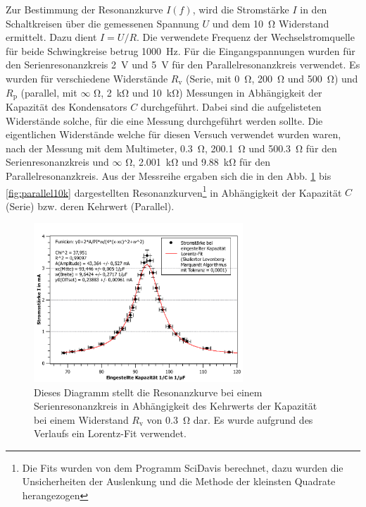 	Zur Bestimmung der Resonanzkurve $I(f)$, wird die Stromstärke $I$ in den Schaltkreisen über die gemessenen Spannung $U$ und dem \SI{10}{\ohm} Widerstand ermittelt.
	Dazu dient $I = U/R$.
	Die verwendete Frequenz der Wechselstromquelle für beide Schwingkreise betrug \SI{1000}{\hertz}.
	Für die Eingangspannungen wurden für den Serienresonanzkreis \SI{2}{\volt} und \SI{5}{\volt} für den Parallelresonanzkreis verwendet.
	Es wurden für verschiedene Widerstände $R_\text{v}$ (Serie, mit \SI{0}{\ohm}, \SI{200}{\ohm} und \SI{500}{\ohm}) und $R_\text{p}$ (parallel, mit $\infty$ \si{\ohm}, \SI{2}{\kilo\ohm} und \SI{10}{\kilo\ohm}) Messungen in Abhängigkeit der Kapazität des Kondensators $C$ durchgeführt. 
	Dabei sind die aufgelisteten Widerstände solche, für die eine Messung durchgeführt werden sollte.
	Die eigentlichen Widerstände welche für diesen Versuch verwendet wurden waren, nach der Messung mit dem Multimeter, \SI{0,3}{\ohm}, \SI{200,1}{\ohm} und \SI{500,3}{\ohm} für den Serienresonanzkreis und $\infty$ \si{\ohm}, \SI{2,001}{\kilo\ohm} und \SI{9,88}{\kilo\ohm} für den Parallelresonanzkreis.
	Aus der Messreihe ergaben sich die in den Abb. \ref{fig:reihe0} bis \ref{fig:parallel10k} dargestellten Resonanzkurven\footnote{Die Fits wurden von dem Programm SciDavis berechnet, dazu wurden die Unsicherheiten der Auslenkung und die Methode der kleinsten Quadrate herangezogen} in Abhängigkeit der Kapazität $C$ (Serie) bzw. deren Kehrwert (Parallel). 
	\begin{figure}[ht]
		\centering
		\includegraphics[width=0.7\textwidth]{auswertung/Reihe-0ohm(algo).pdf}
		\caption{Dieses Diagramm stellt die Resonanzkurve bei einem Serienresonanzkreis in Abhängigkeit des Kehrwerts der Kapazität bei einem Widerstand $R_\text{v}$ von \SI{0,3}{\ohm} dar. Es wurde aufgrund des Verlaufs ein Lorentz-Fit verwendet.}
		\label{fig:reihe0}	
	\end{figure}
